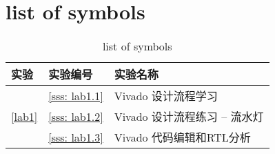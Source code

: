\section*{list of symbols} \label{section: symbols}

\begin{table}[ht]
    \centering
    \caption{list of symbols}
    \begin{tabular}[t]
        {m{}m{}m{}}
        \toprule
        \textbf{实验}               & \textbf{实验编号} & \textbf{实验名称}            \\
        \midrule
        \multirow{3}{*}{\ref{lab1}} & \ref{sss: lab1.1} & Vivado 设计流程学习          \\
                                    & \ref{sss: lab1.2} & Vivado 设计流程练习 – 流水灯 \\
                                    & \ref{sss: lab1.3} & Vivado 代码编辑和RTL分析     \\
        \bottomrule
    \end{tabular}
\end{table}